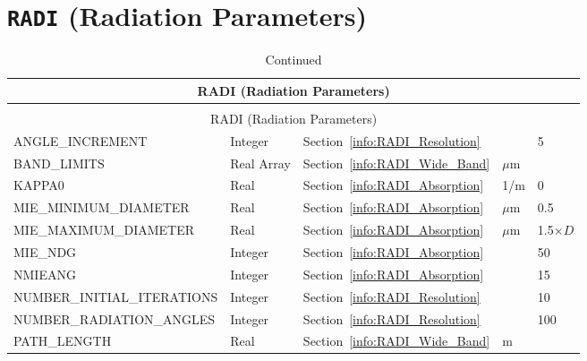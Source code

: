 \documentclass[11pt]{book}
\begin{document}
\section{\texorpdfstring{{\tt RADI}}{RADI} (Radiation Parameters)}

\begin{longtable}{@{\extracolsep{\fill}}|l|l|l|l|l|}
\caption[Radiation parameters ({\ct RADI} namelist group)]{For more information see Section~\ref{info:RADI}.}
\label{tbl:RADI} \\
\hline
\multicolumn{5}{|c|}{{\ct RADI} (Radiation Parameters)} \\
\hline \hline
\endfirsthead
\caption[]{Continued} \\
\hline
\multicolumn{5}{|c|}{{\ct RADI} (Radiation Parameters)} \\
\hline \hline
\endhead
{\ct ANGLE\_INCREMENT}              & Integer       & Section~\ref{info:RADI_Resolution}        &                   & 5                 \\ \hline
{\ct BAND\_LIMITS    }              & Real Array    & Section~\ref{info:RADI_Wide_Band}         &  $\mu$m           &                   \\ \hline
{\ct KAPPA0                   }     & Real          & Section~\ref{info:RADI_Absorption}        & 1/m               & 0                 \\ \hline
{\ct MIE\_MINIMUM\_DIAMETER}        & Real          & Section~\ref{info:RADI_Absorption}        & $\mu$m            & 0.5               \\ \hline
{\ct MIE\_MAXIMUM\_DIAMETER}        & Real          & Section~\ref{info:RADI_Absorption}        & $\mu$m            & 1.5$\times D$     \\ \hline
{\ct MIE\_NDG}                      & Integer       & Section~\ref{info:RADI_Absorption}        &                   & 50                \\ \hline
{\ct NMIEANG                  }     & Integer       & Section~\ref{info:RADI_Absorption}        &                   & 15                \\ \hline
{\ct NUMBER\_INITIAL\_ITERATIONS}   & Integer       & Section~\ref{info:RADI_Resolution}        &                   & 10                \\ \hline
{\ct NUMBER\_RADIATION\_ANGLES}     & Integer       & Section~\ref{info:RADI_Resolution}        &                   & 100               \\ \hline
{\ct PATH\_LENGTH }                 & Real          & Section~\ref{info:RADI_Wide_Band}         &   m               &                   \\ \hline

\end{longtable}
\end{document}
